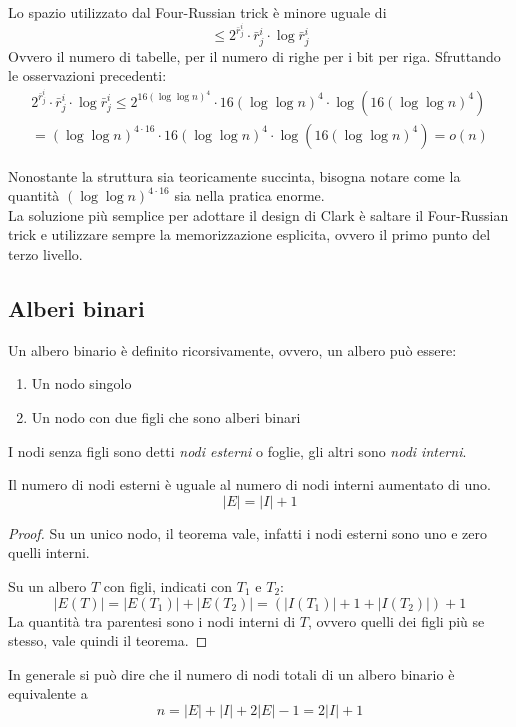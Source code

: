 Lo spazio utilizzato dal Four-Russian trick è minore uguale di
$$\leq 2^{\bar{r}_j^i}\cdot\bar{r}_j^i\cdot\log \bar{r}_j^i$$
Ovvero il numero di tabelle, per il numero di righe per i bit per riga.
Sfruttando le osservazioni precedenti:
\begin{equation}
    \begin{aligned}
        2^{\bar{r}_j^i}\cdot\bar{r}_j^i\cdot\log \bar{r}_j^i
        \leq 2^{16 (\log \log n)^4}\cdot 16(\log \log n)^4 \cdot \log(16(\log \log n)^4)\\
        = (\log \log n)^{4\cdot 16} \cdot 16(\log \log n)^4\cdot \log(16(\log \log n)^4) = o(n)
    \end{aligned}
\end{equation}
\begin{remark}
    Nonostante la struttura sia teoricamente succinta, bisogna notare come 
    la quantità $(\log \log n)^{4\cdot 16}$ sia nella pratica enorme.\\
    La soluzione più semplice per adottare il design di Clark è saltare il 
    Four-Russian trick e utilizzare sempre la memorizzazione esplicita, 
    ovvero il primo punto del terzo livello.
\end{remark}
\subsection{Alberi binari}
Un albero binario è definito ricorsivamente, ovvero, un albero può essere:
\begin{enumerate}
    \item Un nodo singolo
    \item Un nodo con due figli che sono alberi binari
\end{enumerate}
I nodi senza figli sono detti \emph{nodi esterni} o foglie, 
gli altri sono \emph{nodi interni}.

\begin{theorem}
    Il numero di nodi esterni è uguale al numero di nodi interni aumentato di uno.
    $$|E| = |I| + 1$$
\end{theorem}
\begin{proof}
    Su un unico nodo, il teorema vale, infatti i nodi esterni sono uno e zero 
    quelli interni.

    Su un albero $T$ con figli, indicati con $T_1$ e $T_2$: 
    $$|E(T)| = |E(T_1)| + |E(T_2)| = (|I(T_1)| + 1 + |I(T_2)|) + 1$$
    La quantità tra parentesi sono i nodi interni di $T$, ovvero quelli dei 
    figli più se stesso, vale quindi il teorema.
\end{proof}
In generale si può dire che il numero di nodi totali di un albero binario 
è equivalente a $$n = |E| + |I| + 2|E| - 1 = 2|I| + 1$$

